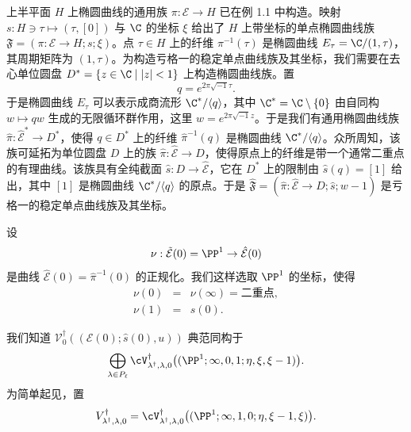 上半平面 $H$ 上椭圆曲线的通用族 $\pi:\mathcal E\to H$ 已在例 1.1 中构造。映射 $s:H\ni\tau\mapsto(\tau,[0])$ 与 $\C$ 的坐标 $\xi$ 给出了 $H$ 上带坐标的单点椭圆曲线族 $\mathfrak{F}=(\pi:\mathcal E\to H;s;\xi)$。点 $\tau\in H$ 上的纤维 $\pi^{-1}(\tau)$ 是椭圆曲线 $E_\tau=\C/(1,\tau)$，其周期矩阵为 $(1,\tau)$。为构造亏格一的稳定单点曲线族及其坐标，我们需要在去心单位圆盘 $D^*=\{z\in\C\mid |z|<1\}$ 上构造椭圆曲线族。置
\[
q=e^{2\pi\sqrt{-1}\tau}.
\]
于是椭圆曲线 $E_\tau$ 可以表示成商流形 $\C^*/\langle q\rangle$，其中 $\C^*=\C\setminus\{0\}$ 由自同构 $w\mapsto qw$ 生成的无限循环群作用，这里 $w=e^{2\pi\sqrt{-1}z}$。于是我们有通用椭圆曲线族 $\hat\pi:\hat{\mathcal E}^*\to D^*$，使得 $q\in D^*$ 上的纤维 $\hat\pi^{-1}(q)$ 是椭圆曲线 $\C^*/\langle q\rangle$。众所周知，该族可延拓为单位圆盘 $D$ 上的族 $\hat\pi:\hat{\mathcal E}\to D$，使得原点上的纤维是带一个通常二重点的有理曲线。该族具有全纯截面 $\hat s:D\to\hat{\mathcal E}$，它在 $D^*$ 上的限制由 $\hat s(q)=[1]$ 给出，其中 $[1]$ 是椭圆曲线 $\C^*/\langle q\rangle$ 的原点。于是 $\hat{\mathfrak{F}}=(\hat\pi:\hat{\mathcal E}\to D;\hat s;w-1)$ 是亏格一的稳定单点曲线族及其坐标。


设
\[
\nu:\tilde{\mathcal E}(0)=\PP^1\to\hat{\mathcal E}(0)
\]
是曲线 $\hat{\mathcal E}(0)=\hat\pi^{-1}(0)$ 的正规化。我们这样选取 $\PP^1$ 的坐标，使得
\[
\begin{array}{rcl}
\nu(0) & = & \nu(\infty)=\text{二重点},\\[2pt]
\nu(1) & = & s(0).
\end{array}
\]


我们知道 $\mathcal V^\dagger_0((\mathcal E(0);\hat s(0),u))$ 典范同构于
\[
\bigoplus_{\lambda\in P_\ell}\cV^\dagger_{\lambda^\dagger,\lambda,0}
\bigl((\PP^1;\infty,0,1;\eta,\xi,\xi-1)\bigr).
\]
为简单起见，置
\[
V^\dagger_{\lambda^\dagger,\lambda,0}
=\cV^\dagger_{\lambda^\dagger,\lambda,0}\bigl((\PP^1;\infty,1,0;\eta,\xi-1,\xi)\bigr).
\]

